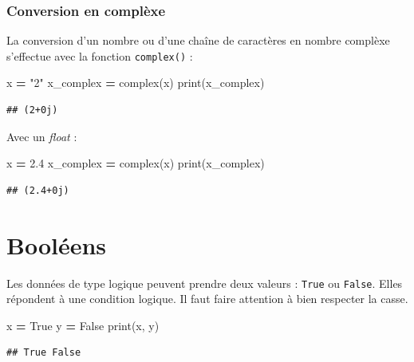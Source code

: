 \documentclass[12pt,]{book}
\newenvironment{Shaded}{\begin{snugshade}}{\end{snugshade}}
\newcommand{\FloatTok}[1]{\textcolor[rgb]{0.00,0.00,0.81}{#1}}
\newcommand{\StringTok}[1]{\textcolor[rgb]{0.31,0.60,0.02}{#1}}
\newcommand{\VariableTok}[1]{\textcolor[rgb]{0.00,0.00,0.00}{#1}}
\newcommand{\OperatorTok}[1]{\textcolor[rgb]{0.81,0.36,0.00}{\textbf{#1}}}
\newcommand{\BuiltInTok}[1]{#1}
\newcommand{\NormalTok}[1]{#1}
\numberwithin{equation}{section}
\numberwithin{countremarque}{section}
\begin{document}
\subsubsection{Conversion en complèxe}\label{conversion-en-complexe}

La conversion d'un nombre ou d'une chaîne de caractères en nombre
complèxe s'effectue avec la fonction \texttt{complex()} :

\begin{Shaded}
\begin{Highlighting}[]
\NormalTok{x }\OperatorTok{=} \StringTok{"2"}
\NormalTok{x_complex }\OperatorTok{=} \BuiltInTok{complex}\NormalTok{(x)}
\BuiltInTok{print}\NormalTok{(x_complex)}
\end{Highlighting}
\end{Shaded}

\begin{lstlisting}
## (2+0j)
\end{lstlisting}

Avec un \emph{float} :

\begin{Shaded}
\begin{Highlighting}[]
\NormalTok{x }\OperatorTok{=} \FloatTok{2.4}
\NormalTok{x_complex }\OperatorTok{=} \BuiltInTok{complex}\NormalTok{(x)}
\BuiltInTok{print}\NormalTok{(x_complex)}
\end{Highlighting}
\end{Shaded}

\begin{lstlisting}
## (2.4+0j)
\end{lstlisting}

\section{Booléens}\label{booleens}

Les données de type logique peuvent prendre deux valeurs : \texttt{True}
ou \texttt{False}. Elles répondent à une condition logique. Il faut
faire attention à bien respecter la casse.

\begin{Shaded}
\begin{Highlighting}[]
\NormalTok{x }\OperatorTok{=} \VariableTok{True}
\NormalTok{y }\OperatorTok{=} \VariableTok{False}
\BuiltInTok{print}\NormalTok{(x, y)}
\end{Highlighting}
\end{Shaded}

\begin{lstlisting}
## True False
\end{lstlisting}
\end{document}
